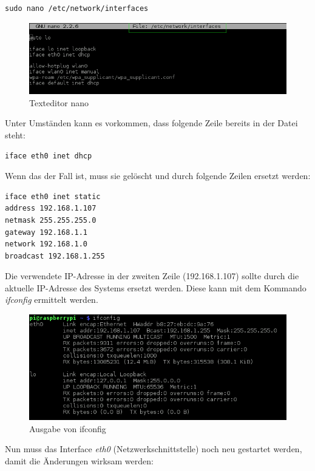 \begin{lstlisting}
sudo nano /etc/network/interfaces
\end{lstlisting} 

\begin{figure}[H]
\centering
\includegraphics[scale=0.65]{images/nano}
\caption{Texteditor nano}
\end{figure}

Unter Umständen kann es vorkommen, dass folgende Zeile bereits in der Datei steht:

\begin{lstlisting}
iface eth0 inet dhcp
\end{lstlisting}

Wenn das der Fall ist, muss sie gelöscht und durch folgende Zeilen ersetzt werden:

\begin{lstlisting}
iface eth0 inet static
address 192.168.1.107
netmask 255.255.255.0
gateway 192.168.1.1
network 192.168.1.0
broadcast 192.168.1.255
\end{lstlisting}

Die verwendete IP-Adresse in der zweiten Zeile (192.168.1.107) sollte durch die aktuelle IP-Adresse des Systems ersetzt werden. Diese kann mit dem Kommando \textit{ifconfig} ermittelt werden.

\begin{figure}[H]
\centering
\includegraphics[scale=0.65]{images/ifconfig}
\caption{Ausgabe von ifconfig}
\end{figure}

Nun muss das Interface \textit{eth0} (Netzwerkschnittstelle) noch neu gestartet werden, damit die Änderungen wirksam werden:


